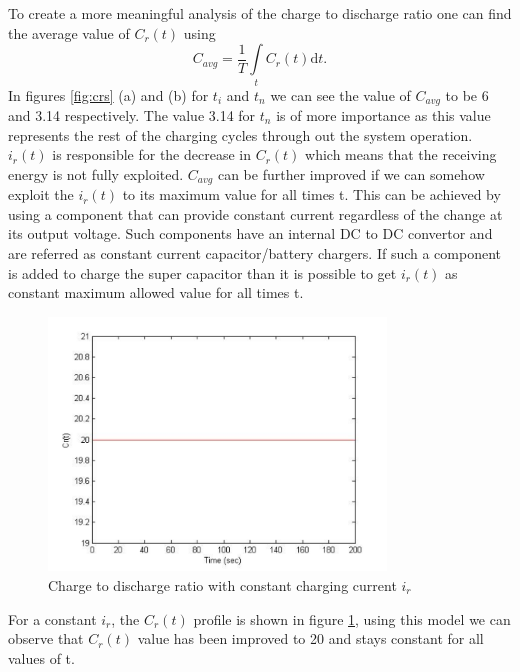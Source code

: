 To create a more meaningful analysis of the charge to discharge ratio one can find the average value of $C_r(t)$ using
\begin{equation}\label{eq:cravg}
C_{avg} = \frac{1}{T}\int\limits_t C_r(t) \mathrm{d}t.
\end{equation}
In figures \ref{fig:crs} (a) and (b) for $t_i$ and $t_n$ we can see the value of $ C_{avg}$ to be 6 and 3.14 respectively. The value 3.14 for $t_n$ is of more importance as this value represents the rest of the charging cycles through out the system operation. $i_r(t)$ is responsible for the decrease in $C_r(t)$ which means that the receiving energy is not fully exploited. $C_{avg}$ can be further improved if we can somehow exploit the $i_r(t)$ to its maximum value for all times t. This can be achieved by using a component that can provide constant current regardless of the change at its output voltage. Such components have an internal DC to DC convertor and are referred as constant current capacitor/battery chargers. If such a component is added to charge the super capacitor than it is possible to get $i_r(t)$ as constant maximum allowed value for all times t.

\begin{figure}[h!]
\centering
\includegraphics[width=0.8\textwidth]{ctd2c.pdf}
\caption{Charge to discharge ratio with constant charging current $i_r$}
\label{fig:crconst}
\end{figure}

For a constant $ i_r$, the $C_r(t)$ profile is shown in figure \ref{fig:crconst}, using this model we can observe that $C_r(t)$ value has been improved to 20 and stays constant for all values of t.
